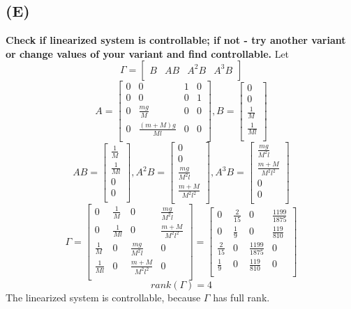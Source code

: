\documentclass[a4paper,11pt]{article}
\theoremstyle{mytheor}
\begin{document}
\subsection*{(E)}
\textbf{Check if linearized system is controllable; if not - try another variant
or change values of your variant and find controllable.}\newline
Let
\[
\Gamma=
\begin{bmatrix}
B&AB&A^{2}B&A^{3}B\\
\end{bmatrix}
\]
\[
A=
\begin{bmatrix}
0&0&1&0\\
0&0&0&1\\
0&\frac{mg}{M}&0&0\\
0&\frac{(m+M)g}{Ml}&0&0\\
\end{bmatrix}
,B=
\begin{bmatrix}
0\\
0\\
\frac{1}{M}\\
\frac{1}{Ml}\\
\end{bmatrix}
\]
\[
AB=
\begin{bmatrix}
\frac{1}{M}\\
\frac{1}{Ml}\\
0\\
0\\
\end{bmatrix}
,A^{2}B=
\begin{bmatrix}
0\\
0\\
\frac{mg}{M^{2}l}\\
\frac{m+M}{M^{2}l^{2}}\\
\end{bmatrix}
,A^{3}B=
\begin{bmatrix}
\frac{mg}{M^{2}l}\\
\frac{m+M}{M^{2}l^{2}}\\
0\\
0\\
\end{bmatrix}
\]
\[
\Gamma=
\begin{bmatrix}
0&\frac{1}{M}&0&\frac{mg}{M^{2}l}\\
0&\frac{1}{Ml}&0&\frac{m+M}{M^{2}l^{2}}\\
\frac{1}{M}&0&\frac{mg}{M^{2}l}&0\\
\frac{1}{Ml}&0&\frac{m+M}{M^{2}l^{2}}&0\\
\end{bmatrix}
=
\begin{bmatrix}
0&\frac{2}{15}&0&\frac{1199}{1875}\\
0&\frac{1}{9}&0&\frac{119}{810}\\
\frac{2}{15}&0&\frac{1199}{1875}&0\\
\frac{1}{9}&0&\frac{119}{810}&0\\
\end{bmatrix}
\]
\[
rank(\Gamma)=4
\]
The linearized system is controllable, because $\Gamma$ has full rank.
\end{document}

